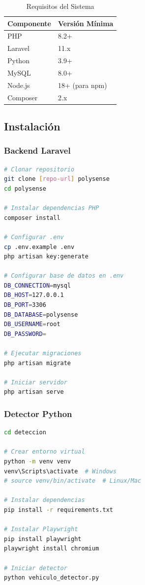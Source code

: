 \documentclass[12pt,a4paper]{article}
\begin{document}
\begin{table}[H]
\centering
\begin{tabular}{|l|l|}
\hline
\textbf{Componente} & \textbf{Versión Mínima} \\
\hline
PHP & 8.2+ \\
Laravel & 11.x \\
Python & 3.9+ \\
MySQL & 8.0+ \\
Node.js & 18+ (para npm) \\
Composer & 2.x \\
\hline
\end{tabular}
\caption{Requisitos del Sistema}
\end{table}

\subsection{Instalación}

\subsubsection{Backend Laravel}

\begin{lstlisting}[caption={Instalación Laravel}, language=bash]
# Clonar repositorio
git clone [repo-url] polysense
cd polysense

# Instalar dependencias PHP
composer install

# Configurar .env
cp .env.example .env
php artisan key:generate

# Configurar base de datos en .env
DB_CONNECTION=mysql
DB_HOST=127.0.0.1
DB_PORT=3306
DB_DATABASE=polysense
DB_USERNAME=root
DB_PASSWORD=

# Ejecutar migraciones
php artisan migrate

# Iniciar servidor
php artisan serve
\end{lstlisting}

\subsubsection{Detector Python}

\begin{lstlisting}[caption={Instalación Detector Python}, language=bash]
cd deteccion

# Crear entorno virtual
python -m venv venv
venv\Scripts\activate  # Windows
# source venv/bin/activate  # Linux/Mac

# Instalar dependencias
pip install -r requirements.txt

# Instalar Playwright
pip install playwright
playwright install chromium

# Iniciar detector
python vehiculo_detector.py
\end{lstlisting}
\end{document}
